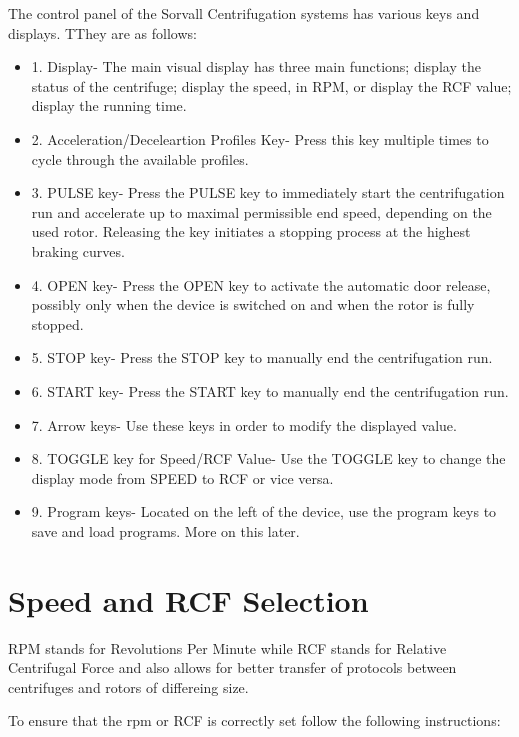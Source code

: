 \documentclass[12pt]{../SOP3_beta}
\begin{document}
\NP The control panel of the Sorvall Centrifugation systems has various keys and displays. TThey are as follows:
\begin{itemize}
  \item 1. Display- The main visual display has three main functions; display the status of the centrifuge; display the speed, in RPM, or display the RCF value; display the running time.
  \item 2. Acceleration/Deceleartion Profiles Key- Press this key multiple times to cycle through the available profiles. 
  \item 3. PULSE key- Press the PULSE key to immediately start the centrifugation run and accelerate up to maximal permissible end speed, depending on the used rotor. Releasing the key initiates a stopping process at the highest braking curves. 
  \item 4. OPEN key- Press the OPEN key to activate the automatic door release, possibly only when the device is switched on and when the rotor is fully stopped.
  \item 5. STOP key- Press the STOP key to manually end the centrifugation run.
  \item 6. START key- Press the START key to manually end the centrifugation run.
  \item 7. Arrow keys- Use these keys in order to modify the displayed value. 
  \item 8. TOGGLE key for Speed/RCF Value- Use the TOGGLE key to change the display mode from SPEED to RCF or vice versa.
  \item 9. Program keys- Located on the left of the device, use the program keys to save and load programs. More on this later.
\end{itemize}
 

\section{Speed and RCF Selection}

\NP RPM stands for Revolutions Per Minute while RCF stands for Relative Centrifugal Force and also allows for better transfer of protocols between centrifuges and rotors of differeing size. 

\NP To ensure that the rpm or RCF is correctly set follow the following instructions:
\end{document}
